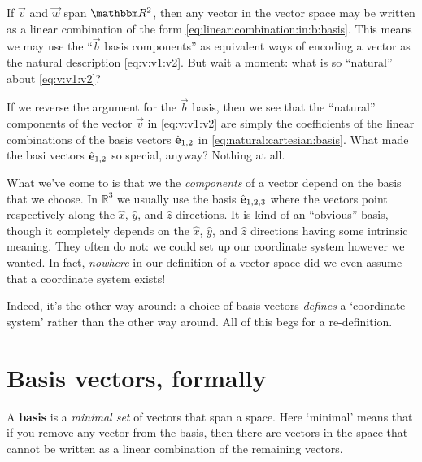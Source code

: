 If $\vec{v}$ and $\vec{w}$ span $\RR ^2$, then any vector in the vector space may be written as a linear combination of the form \eqref{eq:linear:combination:in:b:basis}. This means we may use the ``$\vec{b}$ basis components'' as equivalent ways of encoding a vector as the natural description \eqref{eq:v:v1:v2}. But wait a moment: what is so ``natural'' about \eqref{eq:v:v1:v2}? 

If we reverse the argument for the $\vec{b}$ basis, then we see that the ``natural'' components of the vector $\vec{v}$ in \eqref{eq:v:v1:v2} are simply the coefficients of the linear combinations of the basis vectors ${\hat{\mathbf{e}}}_{1,2}$ in \eqref{eq:natural:cartesian:basis}. What made the basi vectors ${\hat{\mathbf{e}}}_{1,2}$ so special, anyway? Nothing at all. 

What we've come to is that we the \emph{components} of a vector depend on the basis that we choose. In $\mathbb{R}^3$ we usually use the basis ${\hat{\mathbf{e}}}_{1,2,3}$ where the vectors point respectively along the $\hat{x}$, $\hat{y}$, and $\hat{z}$ directions. It is kind of an ``obvious'' basis, though it completely depends on the $\hat{x}$, $\hat{y}$, and $\hat{z}$ directions having some intrinsic meaning. They often do not: we could set up our coordinate system however we wanted. In fact, \emph{nowhere} in our definition of a vector space did we even assume that a coordinate system exists!

Indeed, it's the other way around: a choice of basis vectors \emph{defines} a `coordinate system' rather than the other way around. All of this begs for a re-definition.





\section{Basis vectors, formally}

A \textbf{basis} is a \emph{minimal set} of vectors that span a space. Here `minimal' means that if you remove any vector from the basis, then there are vectors in the space that cannot be written as a linear combination of the remaining vectors.

